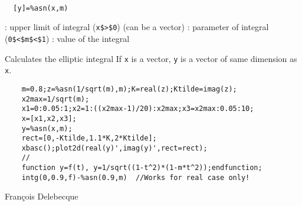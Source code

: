 
\begin{mandesc}
   \\ %
\end{mandesc}
\begin{calling_sequence}
\begin{verbatim}
  [y]=%asn(x,m)  
\end{verbatim}
\end{calling_sequence}
\begin{parameters}
  \begin{varlist}
    : upper limit of integral (\verb!x$>$0!) (can be a vector)
    : parameter of integral (\verb!0$<$m$<$1!)
    : value of the integral
  \end{varlist}
\end{parameters}
\begin{mandescription}
  Calculates the elliptic integral
  If \verb!x! is a vector, \verb!y! is a vector of same dimension as \verb!x!.
\end{mandescription}
\begin{examples}
  \begin{Verbatim}
    m=0.8;z=%asn(1/sqrt(m),m);K=real(z);Ktilde=imag(z);
    x2max=1/sqrt(m);
    x1=0:0.05:1;x2=1:((x2max-1)/20):x2max;x3=x2max:0.05:10;
    x=[x1,x2,x3];
    y=%asn(x,m);
    rect=[0,-Ktilde,1.1*K,2*Ktilde];
    xbasc();plot2d(real(y)',imag(y)',rect=rect);
    //
    function y=f(t), y=1/sqrt((1-t^2)*(1-m*t^2));endfunction;
    intg(0,0.9,f)-%asn(0.9,m)  //Works for real case only!
  \end{Verbatim}
\end{examples}
\begin{authors}
  Fran\c{c}ois  Delebecque  
\end{authors}
